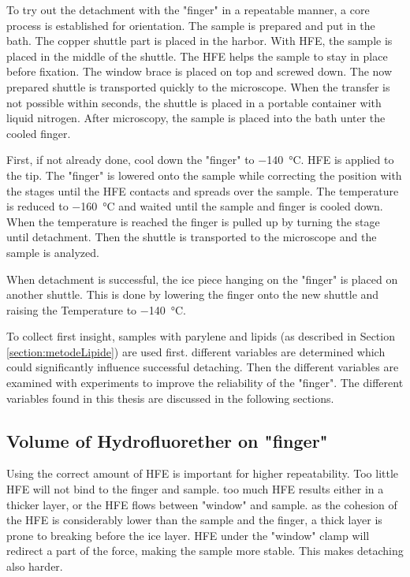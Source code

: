 To try out the detachment with the "finger" in a repeatable manner, a core process is established for orientation. The sample is prepared and put in the bath. The copper shuttle part is placed in the harbor. With HFE, the sample is placed in the middle of the shuttle. The HFE helps the sample to stay in place before fixation. The window brace is placed on top and screwed down. The now prepared shuttle is transported quickly to the microscope. When the transfer is not possible within seconds, the shuttle is placed in a portable container with liquid nitrogen. After microscopy, the sample is placed into the bath unter the cooled finger. 

First, if not already done, cool down the "finger" to \SI{-140}{\degreeCelsius}. HFE is applied to the tip. The "finger" is lowered onto the sample while correcting the position with the stages until the HFE contacts and spreads over the sample. The temperature is reduced to \SI{-160}{\degreeCelsius} and waited until the sample and finger is cooled down. When the temperature is reached the finger is pulled up by turning the stage until detachment. Then the shuttle is transported to the microscope and the sample is analyzed. 

When detachment is successful, the ice piece hanging on the "finger" is placed on another shuttle. This is done by lowering the finger onto the new shuttle and raising the Temperature to \SI{-140}{\degreeCelsius}.

To collect first insight, samples with parylene and lipids (as described in Section \ref{section:metodeLipide}) are used first. different variables are determined which could significantly influence successful detaching. Then the different variables are examined with experiments to improve the reliability of the "finger". The different variables found in this thesis are discussed in the following sections.

\subsection{Volume of Hydrofluorether on "finger"}

Using the correct amount of HFE is important for higher repeatability. Too little HFE will not bind to the finger and sample. too much HFE results either in a thicker layer, or the HFE flows between "window" and sample.
as the cohesion of the HFE is considerably lower than the sample and the finger, a thick layer is prone to breaking before the ice layer. HFE under the "window" clamp will redirect a part of the force, making the sample more stable. This makes detaching also harder.

